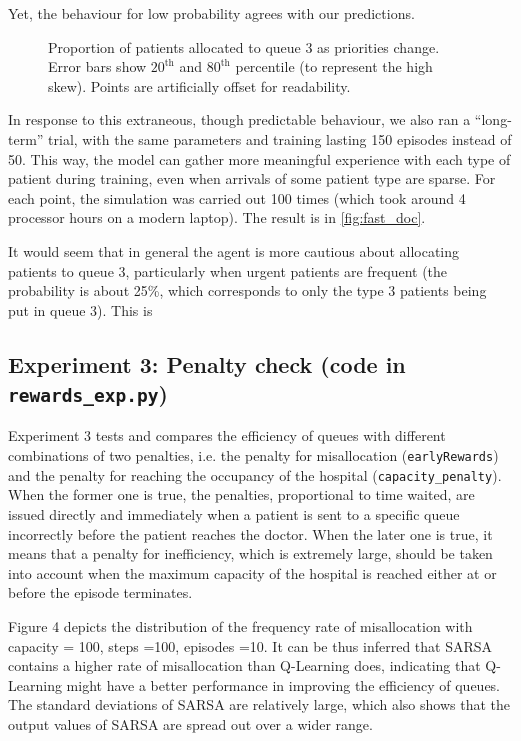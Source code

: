 \documentclass[11point]{article}
\begin{document}
Yet, the behaviour for low probability agrees with our predictions.
\begin{figure}[H]
    \centering
    \resizebox{\columnwidth}{!}{
    
    }
    \caption{Proportion of patients allocated to queue 3 as priorities change. Error bars show $20^\text{th}$ and $80^\text{th}$ percentile (to represent the high skew). Points are artificially offset for readability.}
    \label{fig:fast_doc}
\end{figure}

In response to this extraneous, though predictable behaviour, we also ran a ``long-term'' trial, with the same parameters and training lasting 150 episodes instead of 50.
This way, the model can gather more meaningful experience with each type of patient during training, even when arrivals of some patient type are sparse.
For each point, the simulation was carried out 100 times (which took around 4 processor hours on a modern laptop).
The result is in \autoref{fig:fast_doc}.

It would seem that in general the agent is more cautious about allocating patients to queue 3, particularly when urgent patients are frequent (the probability is about 25\%, which corresponds to only the type 3 patients being put in queue 3).
This is 

\subsection{Experiment 3: Penalty check (code in \texttt{rewards\_exp.py})}
Experiment 3 tests and compares the efficiency of queues with different combinations of two penalties, i.e. the penalty for misallocation (\texttt{earlyRewards}) and the penalty for reaching the occupancy of the hospital (\texttt{capacity\_penalty}). When the former one is true, the penalties, proportional to time waited, are issued directly and immediately when a patient is sent to a specific queue incorrectly before the patient reaches the doctor. When the later one is true, it means that a penalty for inefficiency, which is extremely large, should be taken into account when the maximum capacity of the hospital is reached either at or before the episode terminates.

Figure 4 depicts the distribution of the frequency rate of misallocation with capacity = 100, steps =100, episodes =10. It can be thus inferred that SARSA contains a higher rate of misallocation than Q-Learning does, indicating that Q-Learning might have a better performance in improving the efficiency of queues. The standard deviations of SARSA are relatively large, which also shows that the output values of SARSA are spread out over a wider range.
\end{document}
